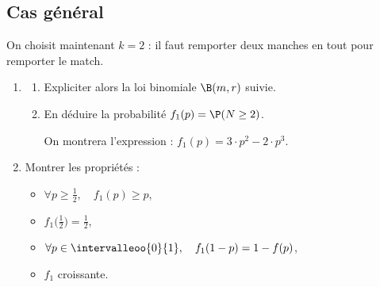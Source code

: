 \documentclass[12pt]{article}
\begin{document}
\subsection{Cas général}
On choisit maintenant $k=2$ : il faut remporter deux manches en tout pour remporter le match.
\begin{enumerate}[resume]
  \item
    \begin{enumerate}
      \item Expliciter alors la loi binomiale $\B(m,r)$ suivie.
      \item En déduire la probabilité $f_{1}(p)=\P(N \ge 2)$.

        On montrera l'expression : \quad $f_1(p) = 3 \cdot p^2 - 2\cdot p^3$.
    \end{enumerate}
  \item \label{fUn}Montrer les propriétés : \quad
    \begin{minipage}[t]{6cm}
        \begin{itemize}
            \item $\forall p \ge \frac{1}{2}, \quad f_1(p) \ge p$,
            \item $f_1\big(\frac{1}{2}\big) = \frac{1}{2}$,
        \end{itemize}
      \end{minipage}
    \begin{minipage}[t]{7cm}
        \begin{itemize}
            \item $\forall p \in \intervalleoo{0}{1}, \quad f_1(1-p) = 1-f(p)$,
            \item $f_1$ croissante.
        \end{itemize}
      \end{minipage}

\end{enumerate}
\end{document}
